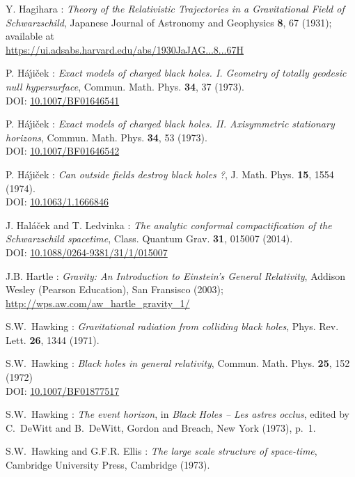 \begin{thebibliography}{123}
Y. Hagihara :
\emph{Theory of the Relativistic Trajectories in a Gravitational Field of Schwarzschild},
Japanese Journal of Astronomy and Geophysics {\bf 8}, 67 (1931);
available at \\
\url{https://ui.adsabs.harvard.edu/abs/1930JaJAG...8...67H}

P. H\'a\'\j i\v{c}ek : {\em Exact models of charged black holes. I. Geometry
of totally geodesic null hypersurface},
Commun. Math. Phys. {\bf 34}, 37 (1973). \\
DOI: \href{https://doi.org/10.1007/BF01646541}{10.1007/BF01646541}

P. H\'a\'\j i\v{c}ek : {\em Exact models of charged black holes.
II. Axisymmetric stationary horizons},
Commun. Math. Phys. {\bf 34}, 53 (1973). \\
DOI: \href{https://doi.org/10.1007/BF01646542}{10.1007/BF01646542}

P. H\'a\'\j i\v{c}ek : {\em Can outside fields destroy black holes ?},
J. Math. Phys. {\bf 15}, 1554 (1974). \\
DOI: \href{https://doi.org/10.1063/1.1666846}{10.1063/1.1666846}

J. Hal\'a\v{c}ek and T. Ledvinka :
{\em The analytic conformal compactification of the Schwarzschild spacetime},
Class. Quantum Grav. {\bf 31}, 015007 (2014).\\
DOI: \href{https://doi.org/10.1088/0264-9381/31/1/015007}{10.1088/0264-9381/31/1/015007}

J.B. Hartle : \emph{Gravity: An Introduction to Einstein's General Relativity},
Addison Wesley (Pearson Education), San Fransisco (2003); \\
\url{http://wps.aw.com/aw_hartle_gravity_1/}

S.W.~Hawking : {\em Gravitational radiation from colliding black holes},
Phys. Rev. Lett. {\bf 26}, 1344 (1971).

S.W.~Hawking : {\em Black holes in general relativity},
Commun. Math. Phys. {\bf 25}, 152 (1972)\\
DOI: \href{https://doi.org/10.1007/BF01877517}{10.1007/BF01877517}

S.W.~Hawking : {\em The event horizon},
in {\em Black Holes -- Les astres occlus}, edited by C.~DeWitt and B.~DeWitt,
Gordon and Breach, New York (1973), p.~1.

S.W.~Hawking and G.F.R. Ellis : {\em The large scale structure of
space-time},
Cambridge University Press, Cambridge (1973).


\end{thebibliography}
